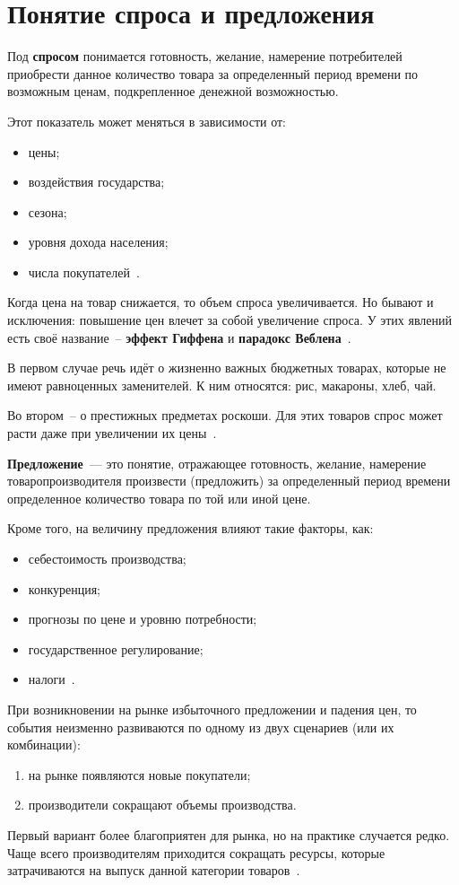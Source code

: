 \chapter{Понятие спроса и предложения}

Под \textbf{спросом} понимается готовность, желание, намерение потребителей приобрести данное количество товара за определенный период времени по возможным ценам, подкрепленное денежной возможностью. 

Этот показатель может меняться в зависимости от:
\begin{itemize}
	\item цены;
	\item воздействия государства;
	\item сезона;
	\item уровня дохода населения;
	\item числа покупателей~\cite{law1}.
\end{itemize}

Когда цена на товар снижается, то объем спроса увеличивается. 
Но бывают и исключения: повышение цен влечет за собой увеличение спроса. 
У этих явлений есть своё название~-- \textbf{эффект Гиффена} и \textbf{парадокс Веблена}~\cite{law1}.
 
В первом случае речь идёт о жизненно важных бюджетных товарах, которые не имеют равноценных заменителей.
К ним относятся: рис, макароны, хлеб, чай.

Во втором~-- о престижных предметах роскоши. 
Для этих товаров спрос может расти даже при увеличении их цены~\cite{law2}. 

\textbf{Предложение}~--- это понятие, отражающее готовность, желание, намерение товаропроизводителя произвести (предложить) за определенный период времени определенное количество товара по той или иной цене.

Кроме того, на величину предложения влияют такие факторы, как:
\begin{itemize}
	\item себестоимость производства;
	\item конкуренция;
	\item прогнозы по цене и уровню потребности;
	\item государственное регулирование;
	\item налоги~\cite{law1}.
\end{itemize}

При возникновении на рынке избыточного предложении и падения цен, то события неизменно развиваются по одному из двух сценариев (или их комбинации):
\begin{enumerate}
	\item на рынке появляются новые покупатели;
	\item производители сокращают объемы производства.
\end{enumerate}

Первый вариант более благоприятен для рынка, но на практике случается редко. 
Чаще всего производителям приходится сокращать ресурсы, которые затрачиваются на выпуск данной категории товаров~\cite{law2}.

